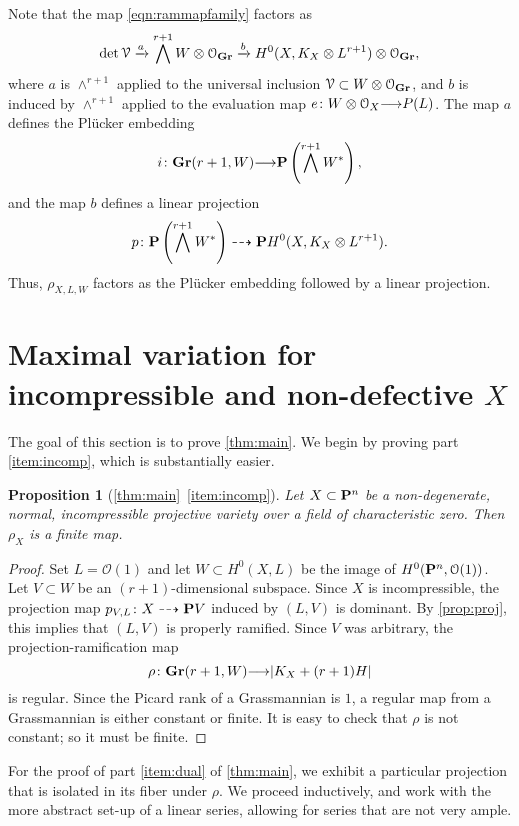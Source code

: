 \documentclass[11pt,reqno]{amsart}
\theoremstyle{plain}
\newtheorem{proposition}[theorem]{Proposition}
\theoremstyle{definition}
\theoremstyle{remark}
\numberwithin{equation}{section}
\renewcommand{\to}{{\longrightarrow}}
\numberwithin{equation}{section}
\renewcommand{\O}{\mathcal O}
\begin{document}
Note that the map \eqref{eqn:rammapfamily} factors as
\[ \det \mathcal V \xrightarrow{a} \bigwedge^{r+1} W \otimes \O_{\Gr} \xrightarrow{b} H^0(X, K_X \otimes L^{r+1}) \otimes \O_{\Gr},\]
where $a$ is $\wedge^{r+1}$ applied to the universal inclusion $\mathcal V \subset W \otimes \O_{\Gr}$, and $b$ is induced by $\wedge^{r+1}$ applied to the evaluation map $e \from W \otimes \O_{X} \to P(L)$.
The map $a$ defines the Pl\"ucker embedding
\[ i \from \Gr(r+1, W) \to \P \left(\bigwedge^{r+1}W^*\right),\]
and the map $b$ defines a linear projection
\[ p \from \P \left(\bigwedge^{r+1}W^*\right) \dashrightarrow \P H^0(X, K_X \otimes L^{r+1}).\]
Thus, $\rho_{X,L,W}$ factors as the Pl\"ucker embedding followed by a linear projection.

\section{Maximal variation for incompressible and non-defective $X$}
\label{sec:proof_of_theorem:main}
The goal of this section is to prove \autoref{thm:main}.
We begin by proving part \eqref{item:incomp}, which is substantially easier.
\begin{proposition}[\autoref{thm:main}~\eqref{item:incomp}]
  \label{prop:incompress}
  Let $X \subset \P^n$ be a non-degenerate, normal, incompressible projective variety over a field of characteristic zero.
  Then $\rho_X$ is a finite map.
\end{proposition}
\begin{proof}
  Set $L = \O(1)$ and let $W \subset H^0(X, L)$ be the image of $H^0(\P^n, \O(1))$.
  Let $V \subset W$ be an $(r+1)$-dimensional subspace.
  Since $X$ is incompressible, the projection map $p_{V,L} \from X \dashrightarrow \P V$ induced by $(L, V)$ is dominant.
  By \autoref{prop:proj}, this implies that $(L, V)$ is properly ramified.
  Since $V$ was arbitrary, the projection-ramification map 
  \[ \rho \from \Gr(r+1, W) \to |K_X + (r+1) H|\]
  is regular.
  Since the Picard rank of a Grassmannian is $1$, a regular map from a Grassmannian is either constant or finite.
  It is easy to check that $\rho$ is not constant; so it must be finite.
\end{proof}

For the proof of part \eqref{item:dual} of \autoref{thm:main}, we exhibit a particular projection that is isolated in its fiber under $\rho$.
We proceed inductively, and work with the more abstract set-up of a linear series, allowing for series that are not very ample.
\end{document}

